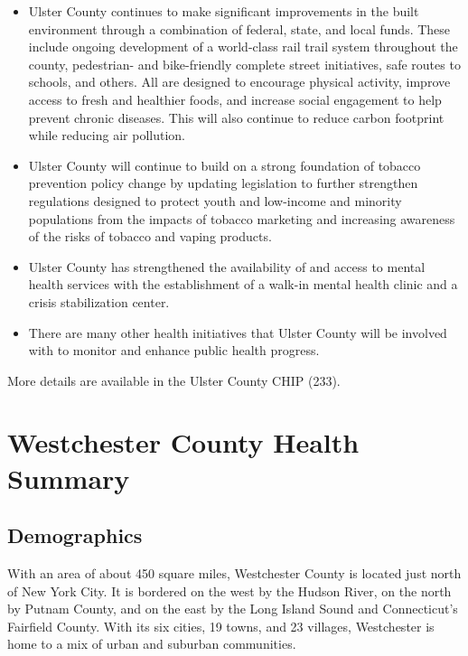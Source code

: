 \documentclass[
  english,
  letterpaper,
]{report}
\providecommand{\tightlist}{%
  \setlength{\itemsep}{0pt}\setlength{\parskip}{0pt}}
\begin{document}
\begin{itemize}
\tightlist
\item
  Ulster County continues to make significant improvements in the built
  environment through a combination of federal, state, and local funds.
  These include ongoing development of a world-class rail trail system
  throughout the county, pedestrian- and bike-friendly complete street
  initiatives, safe routes to schools, and others. All are designed to
  encourage physical activity, improve access to fresh and healthier
  foods, and increase social engagement to help prevent chronic
  diseases. This will also continue to reduce carbon footprint while
  reducing air pollution.
\item
  Ulster County will continue to build on a strong foundation of tobacco
  prevention policy change by updating legislation to further strengthen
  regulations designed to protect youth and low-income and minority
  populations from the impacts of tobacco marketing and increasing
  awareness of the risks of tobacco and vaping products.
\item
  Ulster County has strengthened the availability of and access to
  mental health services with the establishment of a walk-in mental
  health clinic and a crisis stabilization center.
\item
  There are many other health initiatives that Ulster County will be
  involved with to monitor and enhance public health progress.
\end{itemize}

More details are available in the Ulster County CHIP (233).

\section{Westchester County Health
Summary}\label{westchester-county-health-summary}

\subsection{Demographics}\label{demographics-6}

With an area of about 450 square miles, Westchester County is located
just north of New York City. It is bordered on the west by the Hudson
River, on the north by Putnam County, and on the east by the Long Island
Sound and Connecticut's Fairfield County. With its six cities, 19 towns,
and 23 villages, Westchester is home to a mix of urban and suburban
communities.
\end{document}
